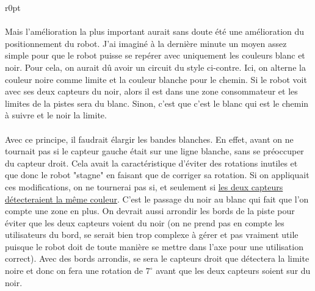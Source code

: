 \documentclass[12pt,oneside,a4paper]{book}
\begin{document}
\begin{wrapfigure}{r}{0pt}
	\end{wrapfigure}
	\paragraph{} Mais l'amélioration la plus important aurait sans doute été une amélioration du positionnement du robot. J'ai imaginé à la dernière minute un moyen assez simple pour que le robot puisse se repérer avec uniquement les couleurs blanc et noir. Pour cela, on aurait dû avoir un circuit du style ci-contre. Ici, on alterne la couleur noire comme limite et la couleur blanche pour le chemin. Si le robot voit avec ses deux capteurs du noir, alors il est dans une zone consommateur et les limites de la pistes sera du blanc. Sinon, c'est que c'est le blanc qui est le chemin à suivre et le noir la limite. 
	\paragraph{} Avec ce principe, il faudrait élargir les bandes blanches. En effet, avant on ne tournait pas si le capteur gauche était sur une ligne blanche, sans se préoccuper du capteur droit. Cela avait la caractéristique d'éviter des rotations inutiles et que donc le robot "stagne" en faisant que de corriger sa rotation. Si on appliquait ces modifications, on ne tournerai pas si, et seulement si \underline{les deux capteurs détecteraient la même couleur}. C'est le passage du noir au blanc qui fait que l'on compte une zone en plus. On devrait aussi arrondir les bords de la piste pour éviter que les deux capteurs voient du noir (on ne prend pas en compte les utilisateurs du bord, se serait bien trop complexe à gérer et pas vraiment utile puisque le robot doit de toute manière se mettre dans l'axe pour une utilisation correct). Avec des bords arrondis, se sera le capteurs droit que détectera la limite noire et donc on fera une rotation de $7^\circ$ avant que les deux capteurs soient sur du noir.
\end{document}
